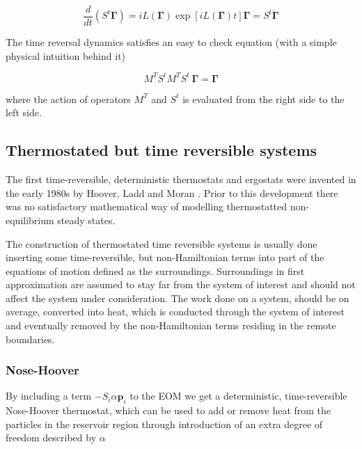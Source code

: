 \documentclass[a4paper,12pt,nofootinbib]{article}
\begin{document}
\begin{equation}
\label{PhaseTimeDer}
  \frac{d}{dt}(S^t \bm{\Gamma})=iL(\bm{\Gamma})\exp[iL(\bm{\Gamma})t]\bm{\Gamma}=S^t \dot{\bm{\Gamma}}
\end{equation}




The time reversal dynamics satisfies an easy to check equation (with a simple physical intuition behind it)

\begin{equation}
  M^T S^t M^T S^t\ \bm{\Gamma} = \bm{\Gamma}
\end{equation}

where the action of operators $M^T$ and $S^t$ is evaluated from the right side to the left side.

\subsection{Thermostated but time reversible systems}

The first time-reversible, deterministic thermostats and ergostats were invented in the early 1980s by Hoover, Ladd and Moran . Prior to this development there was no satisfactory mathematical way of modelling thermostatted non-equilibrium steady states. \cite{Hoover:1982dp}

The construction of thermostated time reversible systems is usually done inserting some time-reversible, but non-Hamiltonian terms into part of the equations of motion defined as the surroundings. Surroundings in first approximation are assumed to stay far from the system of interest and should not affect the system under consideration.
The work done on a system, should be on average, converted into heat, which is conducted through the system of interest and eventually removed by the non-Hamiltonian terms residing in the remote boundaries.

\subsubsection{Nose-Hoover}
By including a term $-S_i \alpha \bm{p}_i $ to the EOM we get a deterministic, time-reversible Nose-Hoover thermostat, which can be used to add or remove heat from the particles in the reservoir region through introduction of an extra degree of freedom described by $\alpha$
\end{document}
